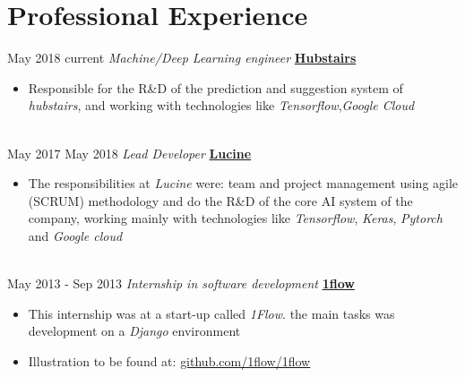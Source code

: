 \documentclass[letterpaper]{twentysecondcv} %
\begin{document}



\section{Professional Experience}

\begin{twenty} %

  \twentyitem
  {May 2018}
    {current}
        {\textit{Machine/Deep Learning engineer}}
        {\href{http://www.hubstairs.com/}{\textbf{Hubstairs}}}
        {}
        {
          {\begin{itemize}
            \item Responsible for the R\&D of the prediction and suggestion
              system of \textit{hubstairs}, and working with technologies like
              \textit{Tensorflow},\textit{Google Cloud}
          \end{itemize}}
        }
    \\
  \twentyitem
  {May 2017}
    {May 2018}
        {\textit{Lead Developer}}
        {\href{http://www.projet-lucine.com/}{\textbf{Lucine}}}
        {}
        {
          {\begin{itemize}
            \item The responsibilities at \textit{Lucine} were: team and project management
              using agile (SCRUM) methodology and do the R\&D of the core AI
              system of the company, working mainly with technologies like
              \textit{Tensorflow}, \textit{Keras}, \textit{Pytorch} and
              \textit{Google cloud}
          \end{itemize}}
        }
    \\


  \twentyitem
      {May 2013 -}
    {Sep 2013}
        {\textit{Internship in software development}}
        {\href{https://github.com/1flow/1flow}{\textbf{1flow}}}
        {}
        {
          {\begin{itemize}
            \item This internship was at a start-up called \textit{1Flow}. the
              main tasks was development on a \textit{Django} environment
        \item Illustration to be found at: \href{https://github.com/1flow/1flow}{github.com/1flow/1flow}
          \end{itemize}}
        }
    \\

\end{twenty}
\end{document}

